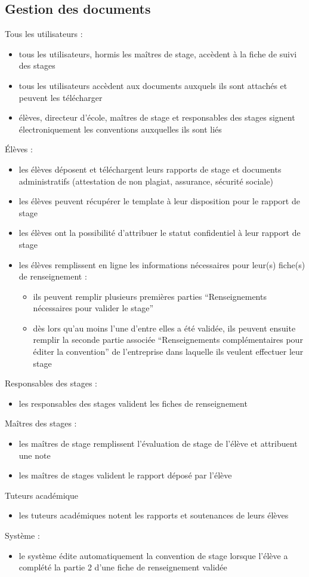 \documentclass{scrreprt}
\begin{document}
\subsection{Gestion des documents}
Tous les utilisateurs : 
\begin{itemize}
\item tous les utilisateurs, hormis les ma\^itres de stage, acc\`edent \`a la fiche de suivi des stages
\item tous les utilisateurs acc\`edent aux documents auxquels ils sont attach\'es et peuvent les t\'el\'echarger
\item \'el\`eves, directeur d’\'ecole, ma\^itres de stage et responsables des stages signent \'electroniquement les conventions auxquelles ils sont li\'es
\end{itemize}
\'El\`eves :
\begin{itemize}
\item les \'el\`eves d\'eposent et t\'el\'echargent leurs rapports de stage et documents administratifs (attestation de non plagiat, assurance, s\'ecurit\'e sociale)
\item les \'el\`eves peuvent r\'ecup\'erer le template \`a leur disposition pour le rapport de stage
\item les \'el\`eves ont la possibilit\'e d’attribuer le statut confidentiel \`a leur rapport de stage
\item les \'el\`eves remplissent en ligne les informations n\'ecessaires pour leur(s) fiche(s) de renseignement :
\begin{itemize}
\item ils peuvent remplir plusieurs premi\`eres parties “Renseignements n\'ecessaires pour valider le stage”
\item dès lors qu’au moins l’une d’entre elles a \'et\'e valid\'ee, ils peuvent ensuite remplir la seconde partie associée “Renseignements complémentaires pour éditer la convention” de l’entreprise dans laquelle ils veulent effectuer leur stage
\end{itemize}
\end{itemize}
Responsables des stages :  
\begin{itemize}
\item les responsables des stages valident les fiches de renseignement
\end{itemize}
Ma\^itres des stages : 
\begin{itemize}
\item les ma\^itres de stage remplissent l’\'evaluation de stage de l’\'el\`eve et attribuent une note
\item les ma\^itres de stages valident le rapport d\'epos\'e par l’\'el\`eve
\end{itemize}
Tuteurs acad\'emique
\begin{itemize}
\item les tuteurs acad\'emiques notent les rapports et soutenances de leurs \'el\`eves
\end{itemize}
Syst\`eme :
\begin{itemize}
\item le syst\`eme \'edite automatiquement la convention de stage lorsque l’\'el\`eve a compl\'et\'e la partie 2 d’une fiche de renseignement valid\'ee
\end{itemize}
\end{document}
